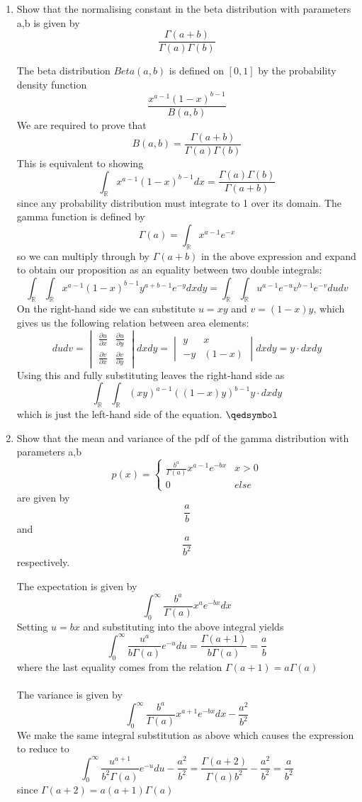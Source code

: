 \documentclass{article}
\newcommand{\chapternumber}{2}
\newenvironment{QandA}{\begin{enumerate}[label=\chapternumber.\arabic*]\bfseries\boldmath}
	{\end{enumerate}}
\newenvironment{answered}{\par\bigskip\normalfont\unboldmath}{}
\begin{document}
\begin{QandA}
		\item Show that the normalising constant in the beta distribution with parameters a,b is given by 
		\[\frac{\Gamma(a+b)}{\Gamma(a)\Gamma(b)}\]
		\begin{answered}
			The beta distribution $Beta(a,b)$ is defined on $[0,1]$ by the probability density function
			\[\frac{x^{a-1}(1-x)^{b-1}}{B(a,b)}\]
			We are required to prove that 
			\[B(a,b)=\frac{\Gamma(a+b)}{\Gamma(a)\Gamma(b)}\]
			This is equivalent to showing
			\[\int_\mathbb{R}x^{a-1}(1-x)^{b-1}dx=\frac{\Gamma(a)\Gamma(b)}{\Gamma(a+b)}\]
			since any probability distribution must integrate to 1 over its domain.
			The gamma function is defined by
			\[\Gamma(a)=\int_\mathbb{R}x^{a-1}e^{-x}\]
			so we can multiply through by $\Gamma(a+b)$ in the above expression and expand to obtain our proposition as an equality between two double integrals:
			\[\int_\mathbb{R}\int_\mathbb{R}x^{a-1}(1-x)^{b-1}y^{a+b-1}e^{-y}dxdy=\int_\mathbb{R}\int_\mathbb{R}u^{a-1}e^{-u}v^{b-1}e^{-v}dudv\]
			On the right-hand side we can substitute $u=xy$ and $v=(1-x)y$, which gives us the following relation between area elements:
			\[dudv=\begin{vmatrix}
			\frac{\partial u}{\partial x} & \frac{\partial u}{\partial y}\\
			\frac{\partial v}{\partial x} & \frac{\partial v}{\partial y}
			\end{vmatrix}dxdy = 
			\begin{vmatrix}
			y & x\\
			-y & (1-x)
			\end{vmatrix}dxdy
			=y\cdot dxdy
			\]
			Using this and fully substituting leaves the right-hand side as
			\[\int_\mathbb{R}\int_\mathbb{R}(xy)^{a-1}((1-x)y)^{b-1}y\cdot dxdy\]
			which is just the left-hand side of the equation. $\qedsymbol$
		\end{answered}
	
	\item Show that the mean and variance of the pdf of the gamma distribution with parameters a,b 
	\[p(x)=\begin{cases}
	\frac{b^a}{\Gamma(a)}x^{a-1}e^{-bx} & x>0\\
	0 & else
	\end{cases}\]
	are given by
	\[\frac{a}{b}\]
	and
	\[\frac{a}{b^2}\]
	respectively.
	\begin{answered}
		The expectation is given by 
		\[\int_0^{\infty} \frac{b^a}{\Gamma(a)}x^ae^{-bx}dx\]
		Setting $u = bx$ and substituting into the above integral yields 
		\[\int_0^{\infty} \frac{u^{a}}{b\Gamma(a)}e^{-u}du=\frac{\Gamma(a+1)}{b\Gamma(a)}=\frac{a}{b}\]
		where the last equality comes from the relation $\Gamma(a+1)=a\Gamma(a)$\\
		\\
		The variance is given by
		\[\int_0^{\infty} \frac{b^a}{\Gamma(a)}x^{a+1}e^{-bx}dx-\frac{a^2}{b^2}\]
		We make the same integral substitution as above which causes the expression to reduce to
		\[\int_0^{\infty} \frac{u^{a+1}}{b^2\Gamma(a)}e^{-u}du-\frac{a^2}{b^2}=\frac{\Gamma(a+2)}{\Gamma(a)b^2}-\frac{a^2}{b^2}=\frac{a}{b^2}\]
		since $\Gamma(a+2)=a(a+1)\Gamma(a)$
	\end{answered}


\end{QandA}
\end{document}
